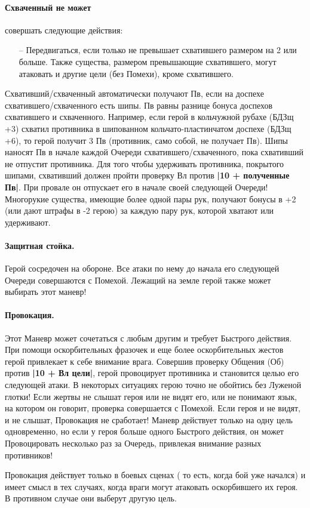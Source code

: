 \paragraph{Схваченный не может} совершать следующие действия:
\begin{itemize}
\item[--] Передвигаться, если только не превышает схватившего размером на 2 или больше. Также существа, размером превышающие схватившего, могут атаковать и другие цели (без Помехи), кроме схватившего. 
\end{itemize}
Схвативший/схваченный автоматически получают Пв, если на доспехе схватившего/схваченного есть шипы. Пв равны разнице бонуса доспехов схватившего и схваченного. Например, если герой в кольчужной рубахе (БДЗщ +3) схватил противника в шипованном кольчато-пластинчатом доспехе (БДЗщ +6), то герой получит 3 Пв (противник, само собой, не получает Пв). Шипы наносят Пв в начале каждой Очереди схватившего/схваченного, пока схвативший не отпустит противника. Для того чтобы удерживать противника, покрытого шипами, схвативший должен пройти проверку Вл против \textbf{|10 + полученные Пв|}. При провале он отпускает его в начале своей следующей Очереди!
\newline
Многорукие существа, имеющие более одной пары рук, получают бонусы в +2 (или дают штрафы в -2 герою) за каждую пару рук, которой хватают или удерживают.
\paragraph{Защитная стойка.} Герой сосредочен на обороне. Все атаки по нему до начала его следующей Очереди совершаются с Помехой. Лежащий на земле герой также может выбирать этот маневр!
\paragraph{Провокация.} Этот Маневр может сочетаться с любым другим и требует Быстрого действия. При помощи оскорбительных фразочек и еще более оскорбительных жестов герой привлекает к себе внимание врага. Совершив проверку Общения (Об) против \textbf{|10 + Вл цели|}, герой провоцирует противника и становится целью его следующей атаки. В некоторых ситуациях герою точно не обойтись без Луженой глотки!
Если жертвы не слышат героя или не видят его, или не понимают язык, на котором он говорит, проверка совершается с Помехой. Если героя и не видят, и не слышат, Провокация не сработает! Маневр действует только на одну цель одновременно, но если у героя больше одного Быстрого действия, он может Провоцировать несколько раз за Очередь, привлекая внимание разных противников!
\begin{tcolorbox}
Провокация действует только в боевых сценах ( то есть, когда бой уже начался) и имеет смысл в тех случаях, когда враги могут атаковать оскорбившего их героя. В противном случае они выберут другую цель. 
\end{tcolorbox}
